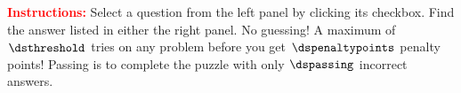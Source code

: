 \documentclass{article}
\begin{document}
\maketitle



\def\answidth{1.7in}
\def\queswidth{2in}
\def\ublength{.5in}
\def\commondepth{6in+2\baselineskip}

\ifeqforpaper\vspace*{-1in}\fi
{\bfseries\noindent
{}
}



\textcolor{red}{\textbf{Instructions:}} Select a question from the
left panel by clicking its checkbox. Find the answer listed in
either the right panel.  No guessing! A maximum of $\dsthreshold$
tries on any problem before you get $\dspenaltypoints$ penalty
points!  Passing is to complete the puzzle with only $\dspassing$
incorrect answers.
\end{document}
